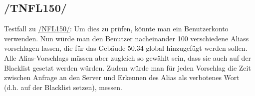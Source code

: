 \subsection*{/TNFL150/}
\label{/TNFL150/} Testfall zu \hyperref[/NFL150/]{/NFL150/}: Um dies zu prüfen, könnte man ein \Gls{Benutzer}konto verwenden. Nun würde man den \Gls{Benutzer} nacheinander 100 verschiedene \Glspl{Alias} vorschlagen lassen, die für das Gebäude 50.34 \gls{global} hinzugefügt werden sollen. Alle \Glspl{Alias-Vorschlag} müssen aber zugleich so gewählt sein, dass sie auch auf der \Gls{Blacklist} gesetzt werden würden. Zudem würde man für jeden Vorschlag die Zeit zwischen Anfrage an den \Gls{Server} und Erkennen des \Gls{Alias} als verbotenes Wort (d.h. auf der \Gls{Blacklist} setzen), messen.